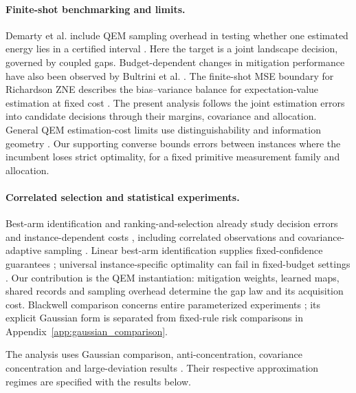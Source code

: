 \documentclass[a4paper,onecolumn,unpublished,nopdfoutputerror]{quantumarticle}
\theoremstyle{plain}
\theoremstyle{definition}
\newcommand{\1}{\mathbf{1}}
\begin{document}
\paragraph{Finite-shot benchmarking and limits.}
Demarty et al. include QEM sampling overhead in testing whether one estimated energy lies in a certified interval \cite{Demarty2026}. Here the target is a joint landscape decision, governed by coupled gaps. Budget-dependent changes in mitigation performance have also been observed by Bultrini et al. \cite{Bultrini2023}. The finite-shot MSE boundary for Richardson ZNE describes the bias--variance balance for expectation-value estimation at fixed cost \cite{Scavino2026Boundary}. The present analysis follows the joint estimation errors into candidate decisions through their margins, covariance and allocation. General QEM estimation-cost limits use distinguishability and information geometry \cite{Takagi2022,Takagi2023,Tsubouchi2022,Quek2024}. Our supporting converse bounds errors between instances where the incumbent loses strict optimality, for a fixed primitive measurement family and allocation.

\paragraph{Correlated selection and statistical experiments.}
Best-arm identification and ranking-and-selection already study decision errors and instance-dependent costs \cite{Bechhofer1954,GuptaPanchapakesan1979,GarivierKaufmann2016}, including correlated observations and covariance-adaptive sampling \cite{GuptaJoshiYagan2021,Saad2023}. Linear best-arm identification supplies fixed-confidence guarantees \cite{JedraProutiere2020}; universal instance-specific optimality can fail in fixed-budget settings \cite{Degenne2023}. Our contribution is the QEM instantiation: mitigation weights, learned maps, shared records and sampling overhead determine the gap law and its acquisition cost. Blackwell comparison concerns entire parameterized experiments \cite{Blackwell1953}; its explicit Gaussian form is separated from fixed-rule risk comparisons in Appendix~\ref{app:gaussian_comparison}.

The analysis uses Gaussian comparison, anti-concentration, covariance concentration and large-deviation results \cite{Slepian1962,Sidak1967,LedouxTalagrand1991,Chernozhukov2013,Boucheron2013,Vershynin2018,KoltchinskiiLounici2017,DemboZeitouni1998}. Their respective approximation regimes are specified with the results below.
\end{document}
